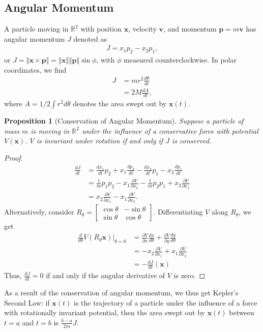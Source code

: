 \documentclass[12pt]{extarticle}
\newcommand{\R}{\mathbb{R}}
\newcommand{\norm}[1]{\left\Vert #1\right\Vert}
\theoremstyle{plain}
\newtheorem*{proposition}{Proposition}%
\theoremstyle{definition}
\theoremstyle{remark}
\renewcommand{\newline}{\hfill\break}
\begin{document}
  \subsection{Angular Momentum}%
  A particle moving in $\R^2$ with position $\mathbf{x}$, velocity $\mathbf{v}$, and momentum $\mathbf{p} = m\mathbf{v}$ has angular momentum $J$ denoted as
  \begin{align*}
    J = x_1p_2 - x_2p_1,
  \end{align*}
  or $J = \norm{\mathbf{x}\times \mathbf{p}} = \norm{\mathbf{x}}\norm{\mathbf{p}}\sin\phi$, with $\phi$ measured counterclockwise. In polar coordinates, we find
  \begin{align*}
    J &= mr^2\frac{d\theta}{dt}\\
      &= 2M\frac{dA}{dt},
  \end{align*}
  where $A= 1/2 \int r^2 d\theta$ denotes the area swept out by $\mathbf{x}(t)$.
  \begin{proposition}[Conservation of Angular Momentum]
    Suppose a particle of mass $m$ is moving in $\R^2$ under the influence of a conservative force with potential $V(\mathbf{x})$. $V$ is invariant under rotation if and only if $J$ is conserved.
  \end{proposition}
  \begin{proof}
    \begin{align*}
      \frac{dJ}{dt} &= \frac{dx_1}{dt}p_2 + x_1\frac{dp_2}{dt} - \frac{dx_2}{dt}p_1 - x_2\frac{dp_1}{dt}\\
                    &= \frac{1}{m}p_1p_2 - x_1\frac{\partial V}{\partial x_2} - \frac{1}{m}p_2p_1 + x_2\frac{\partial V}{\partial x_1}\\
                    &= x_2\frac{\partial V}{\partial x_1} - x_1\frac{\partial V}{\partial x_2}.
    \end{align*}
    Alternatively, consider $R_{\theta} = \begin{bmatrix}\cos\theta & -\sin\theta \\ \sin\theta & \cos\theta\end{bmatrix}$. Differentiating $V$ along $R_{\theta}$, we get
    \begin{align*}
      \frac{d}{d\theta}V(R_{\theta}\mathbf{x})\biggr\vert_{\theta = 0} &= \frac{\partial V}{\partial x}\frac{dx}{d\theta} + \frac{\partial V}{\partial y}\frac{dy}{d\theta}\\
                                                                       &= -x_2\frac{\partial V}{\partial x_1} + x_1\frac{\partial V}{\partial x_2}\\
                                                                       &= -\frac{dJ}{dt}\left(\mathbf{x}\right)
    \end{align*}
    Thus, $\frac{dJ}{dt} = 0$ if and only if the angular derivative of $V$ is zero.
  \end{proof}
  As a result of the conservation of angular momentum, we thus get Kepler's Second Law: if $\mathbf{x}(t)$ is the trajectory of a particle under the influence of a force with rotationally invariant potential, then the area swept out by $\mathbf{x}(t)$ between $t=a$ and $t=b$ is $\frac{b-a}{2m}J$.\newline
\end{document}
